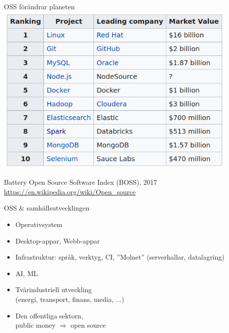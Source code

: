 \documentclass{simpleslides}
\begin{document}
\begin{Slide}{OSS förändrar planeten}
\hspace*{-0.2cm}\includegraphics[width=0.9\textwidth]{img/oss}

{\noindent\tiny Battery Open Source Software Index (BOSS), 2017 \\\href{https://en.wikipedia.org/wiki/Open_source}{https://en.wikipedia.org/wiki/Open\_source}} 

\end{Slide}

\begin{Slide}{OSS \& samhällsutvecklingen}
\begin{itemize}
\item Operativsystem
\item Desktop-appar, Webb-appar
\item Infrastruktur: språk, verktyg, CI, ''Molnet'' (serverhallar, datalagring)
\item AI, ML
\item Tvärindustriell utveckling\\(energi, transport, finans, media, ...)
\item Den offentliga sektorn, \\ public money $\Rightarrow$ open source
\end{itemize}
\end{Slide}
\end{document}
